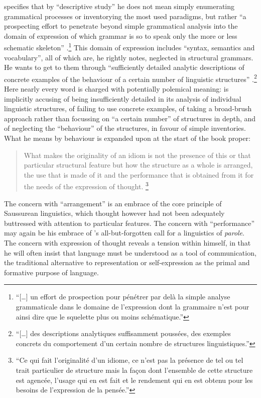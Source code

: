 \documentclass[output=paper]{langscibook}
\begin{document}
{\Sauvageot} specifies that by ``descriptive study'' he does not mean simply enumerating grammatical processes or inventorying the most used paradigms, but rather ``a prospecting effort to penetrate beyond simple grammatical analysis into the domain of expression of which grammar is so to speak only the more or less schematic skeleton'' \citep[7]{Sauvageot1946}.\footnote{``[…] un effort de prospection pour pénétrer par delà la simple analyse grammaticale dans le domaine de l'expression dont la grammaire n'est pour ainsi dire que le squelette plus ou moins schématique.''} This domain of expression includes ``syntax, semantics and vocabulary'', all of which are, he rightly notes, neglected in structural grammars. He wants to get to them through ``sufficiently detailed analytic descriptions of concrete examples of the behaviour of a certain number of linguistic structures'' \citep[7]{Sauvageot1946}.\footnote{``[…] des descriptions analytiques suffisamment poussées, des exemples concrets du comportement d'un certain nombre de structures linguistiques.''} Here nearly every word is charged with potentially polemical meaning: {\Sauvageot} is implicitly accusing  of being insufficiently detailed in its analysis of individual linguistic structures, of failing to use concrete examples, of taking a broad-brush approach rather than focussing on ``a certain number'' of structures in depth, and of neglecting the ``behaviour'' of the structures, in favour of simple inventories. What he means by behaviour is expanded upon at the start of the book proper: 

\largerpage 
\begin{quotation}
What makes the originality of an idiom is not the presence of this or that particular structural feature but how the structure as a whole is arranged, the use that is made of it and the performance that is obtained from it for the needs of the expression of thought. \citep[13]{Sauvageot1946}\footnote{``Ce qui fait l'originalité d'un idiome, ce n'est pas la présence de tel ou tel trait particulier de structure mais la façon dont l'ensemble de cette structure est agencée, l'usage qui en est fait et le rendement qui en est obtenu pour les besoins de l'expression de la pensée.''} 
\end{quotation}

The concern with ``arrangement'' is an embrace of the core principle of Saussurean linguistics, which {\Sauvageot} thought however had not been adequately buttressed with attention to particular features. The concern with ``performance'' may again be his embrace of {\Saussure}'s all-but-forgotten call for a linguistics of \emph{parole}. The concern with expression of thought reveals a tension within {\Sauvageot} himself, in that he will often insist that language must be understood as a tool of communication, the traditional alternative to representation or self-expression as the primal and formative purpose of language.
\end{document}
